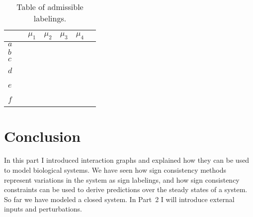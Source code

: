\begin{table}
\centering
{} 
\newcommand\gr{\cellcolor{node_green}{\scriptsize $\plus$}}
\newcommand\ro{\cellcolor{node_red}{\scriptsize $\minus$}}
\newcommand\bl{\cellcolor{node_blue}{\scriptsize $0$}}

\setlength\tabcolsep{2.2pt}
\begin{tabular}{l ccccc|}
\multicolumn{1}{l|}{}   & $\mu_1$&$\mu_2$&$\mu_3$&$\mu_4$  \\
\hline
\multicolumn{1}{l|}{$a$}   & \gr&\gr&\gr&\gr  \\
\multicolumn{1}{l|}{$b$}   & \bl&\gr&\gr&\gr  \\
\multicolumn{1}{l|}{$c$}   & \bl&\bl&\gr&\gr  \\
\multicolumn{1}{l|}{$d$~~} & \bl&\bl&\bl&\ro  \\
\multicolumn{1}{l|}{$e$~~} & \gr&\gr&\gr&\gr  \\
\multicolumn{1}{l|}{$f$~~} & \ro&\ro&\ro&\ro  \\
\end{tabular} 
\bigskip
\caption{Table of admissible labelings.}
\label{tab:labeled} 
\end{table}


\section*{Conclusion}

In this part I introduced interaction graphs and explained how they can be used to model biological systems.
We have seen how sign consistency methods represent variations in the system as sign labelings,
and how sign consistency constraints can be used to derive predictions over the steady states of a system.
So far we have modeled a closed system.
In Part~2 I will introduce external inputs and perturbations.


